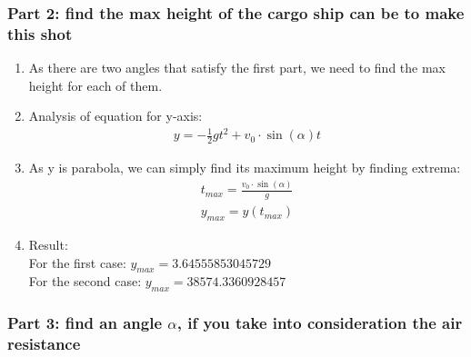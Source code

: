 \subsubsection*{Part 2: find the max height of the cargo ship can be to make this shot}

\begin{enumerate}
    \item As there are two angles that satisfy the first part, we need to find the max height for each of them.
    \item Analysis of equation for y-axis:
          \begin{align}
              y = -\frac{1}{2}gt^2 + v_0 \cdot \sin(\alpha) t
          \end{align}
    \item  As y is parabola, we can simply find its maximum height by finding extrema:
          \begin{align}
              t_{max} = \frac{v_0 \cdot \sin(\alpha)}{g} \\
              y_{max} = y(t_{max})
          \end{align}
    \item Result: \\
          For the first case: $y_{max} = 3.64555853045729$ \\
          For the second case: $y_{max} = 38574.3360928457$
\end{enumerate}

\subsubsection*{Part 3: find an angle $\alpha$, if you take into consideration the air resistance}


